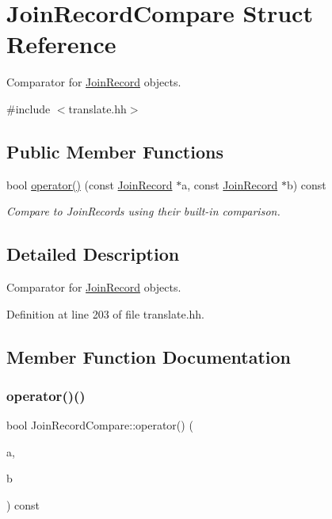 \hypertarget{struct_join_record_compare}{}\section{Join\+Record\+Compare Struct Reference}
\label{struct_join_record_compare}


Comparator for \mbox{\hyperlink{class_join_record}{Join\+Record}} objects.  




{\ttfamily \#include $<$translate.\+hh$>$}

\subsection*{Public Member Functions}
\begin{DoxyCompactItemize}
\item 
bool \mbox{\hyperlink{struct_join_record_compare_ae81f303b48def0508dcbbccb9dd7a4fe}{operator()}} (const \mbox{\hyperlink{class_join_record}{Join\+Record}} $\ast$a, const \mbox{\hyperlink{class_join_record}{Join\+Record}} $\ast$b) const
\begin{DoxyCompactList}\small\item\em Compare to Join\+Records using their built-\/in comparison. \end{DoxyCompactList}\end{DoxyCompactItemize}


\subsection{Detailed Description}
Comparator for \mbox{\hyperlink{class_join_record}{Join\+Record}} objects. 

Definition at line 203 of file translate.\+hh.



\subsection{Member Function Documentation}
\mbox{\label{struct_join_record_compare_ae81f303b48def0508dcbbccb9dd7a4fe}} 
\subsubsection{\texorpdfstring{operator()()}{operator()()}}
{\footnotesize\ttfamily bool Join\+Record\+Compare\+::operator() (\begin{DoxyParamCaption}\item[{const \mbox{\hyperlink{class_join_record}{Join\+Record}} $\ast$}]{a,  }\item[{const \mbox{\hyperlink{class_join_record}{Join\+Record}} $\ast$}]{b }\end{DoxyParamCaption}) const\hspace{0.3cm}{\ttfamily [inline]}}



